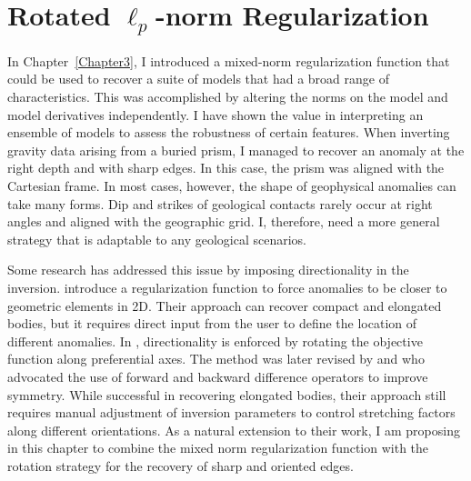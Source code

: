 \graphicspath{{./../Figures/}}
\chapter{Rotated $\ell_p$-norm Regularization}
\label{Chapter5}

In Chapter~\ref{Chapter3}, I introduced a mixed-norm regularization function that could be used to recover a suite of models that had a broad range of characteristics. This was accomplished by altering the norms on the model and model derivatives independently. I have shown the value in interpreting an ensemble of models to assess the robustness of certain features. When inverting gravity data arising from a buried prism, I managed to recover an anomaly at the right depth and with sharp edges. In this case, the prism was aligned with the Cartesian frame.
In most cases, however, the shape of geophysical anomalies can take many forms. Dip and strikes of geological contacts rarely occur at right angles and aligned with the geographic grid. I, therefore, need a more general strategy that is adaptable to any geological scenarios.

Some research has addressed this issue by imposing directionality in the inversion.
\cite{Barbosa2006} introduce a regularization function to force anomalies to be closer to geometric elements in 2D. Their approach can recover compact and elongated bodies, but it requires direct input from the user to define the location of different anomalies.
In \cite{LiDWO2000}, directionality is enforced by rotating the objective function along preferential axes.
The method was later revised by \cite{PhDLelievre09} and \cite{Davis2012} who advocated the use of forward and backward difference operators to improve symmetry. While successful in recovering elongated bodies, their approach still requires manual adjustment of inversion parameters to control stretching factors along different orientations.
As a natural extension to their work, I am proposing in this chapter to combine the mixed norm regularization function with the rotation strategy for the recovery of sharp and oriented edges.

